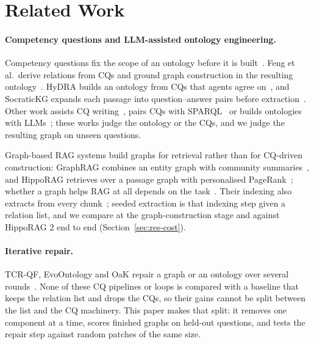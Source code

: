 \section{Related Work}
\label{sec:related}

\paragraph{Competency questions and LLM-assisted ontology engineering.}
Competency questions fix the scope of an ontology before it is built~\cite{gruninger1995methodology,noy2001ontology101}. Feng et al.\ derive relations from CQs and ground graph construction in the resulting ontology~\cite{feng2024ontologygrounded}. HyDRA builds an ontology from CQs that agents agree on~\cite{kaiser2025hydra}, and SocraticKG expands each passage into question--answer pairs before extraction~\cite{choi2026socratickg}. Other work assists CQ writing~\cite{zhang2024ontochat,pan2024rag}, pairs CQs with SPARQL~\cite{taghzouti2025q2forge} or builds ontologies with LLMs~\cite{lippolis2025ontogenia}; these works judge the ontology or the CQs, and we judge the resulting graph on unseen questions.

Graph-based RAG systems build graphs for retrieval rather than for CQ-driven construction: GraphRAG combines an entity graph with community summaries~\cite{edge2024graphrag}, and HippoRAG retrieves over a passage graph with personalised PageRank~\cite{gutierrez2024hipporag}; whether a graph helps RAG at all depends on the task~\cite{xiang2026graphragbench}. Their indexing also extracts from every chunk~\cite{guo2024lightrag}; seeded extraction is that indexing step given a relation list, and we compare at the graph-construction stage and against HippoRAG 2 end to end (Section~\ref{sec:res-cost}).

\paragraph{Iterative repair.}
TCR-QF, EvoOntology and OaK repair a graph or an ontology over several rounds~\cite{huang2025tcrqf,chong2026evoontology,zhang2026oak}. None of these CQ pipelines or loops is compared with a baseline that keeps the relation list and drops the CQs, so their gains cannot be split between the list and the CQ machinery. This paper makes that split: it removes one component at a time, scores finished graphs on held-out questions, and tests the repair step against random patches of the same size.

